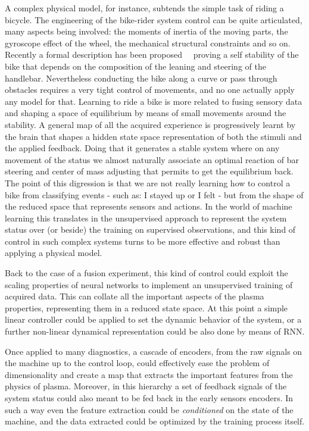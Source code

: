 A complex physical model, for instance, subtends the simple task of riding a bicycle. The engineering of the bike-rider system control can be quite articulated, many aspects being involved: the moments of inertia of the moving parts, the gyroscope effect of the wheel, the mechanical structural constraints and so on. 
Recently a formal description has been proposed~\cite{rideabike_nature_2016}~\cite{papadopulos_bike} proving a self stability of the bike that depends on the composition of the leaning and steering of the handlebar. Nevertheless conducting the bike along a curve or pass through obstacles requires a very tight control of movements, and no one actually apply any model for that. Learning to ride a bike is more related to fusing sensory data and shaping a space of equilibrium by means of small movements around the stability. A general map of all the acquired experience is progressively learnt by the brain that shapes a hidden state space representation of both the stimuli and the applied feedback. Doing that it generates a stable system where on any movement of the status we almost naturally associate an optimal reaction of bar steering and center of mass adjusting that permits to get the equilibrium back.
The point of this digression is that we are not really learning how to control a bike from classifying events - such as: I stayed up or I felt - but from the shape of the reduced space that represents sensors and actions. In the world of machine learning this translates in the unsupervised approach to represent the system status over (or beside) the training on supervised observations, and this kind of control in such complex systems turns to be more effective and robust than applying a physical model.

Back to the case of a fusion experiment, this kind of control could exploit the scaling properties of neural networks to implement an unsupervised training of acquired data. This can collate all the important aspects of the plasma properties, representing them in a reduced state space. At this point a simple linear controller could be applied to set the dynamic behavior of the system, or a further non-linear dynamical representation could be also done by means of \acl{RNN}.

Once applied to many diagnostics, a cascade of encoders, from the raw signals on the machine up to the control loop, could effectively ease the problem of dimensionality and create a map that extracts the important features from the physics of plasma. Moreover, in this hierarchy a set of feedback signals of the system status could also meant to be fed back in the early sensors encoders. In such a way even the feature extraction could be \textit{conditioned} on the state of the machine, and the data extracted could be optimized by the training process itself.

